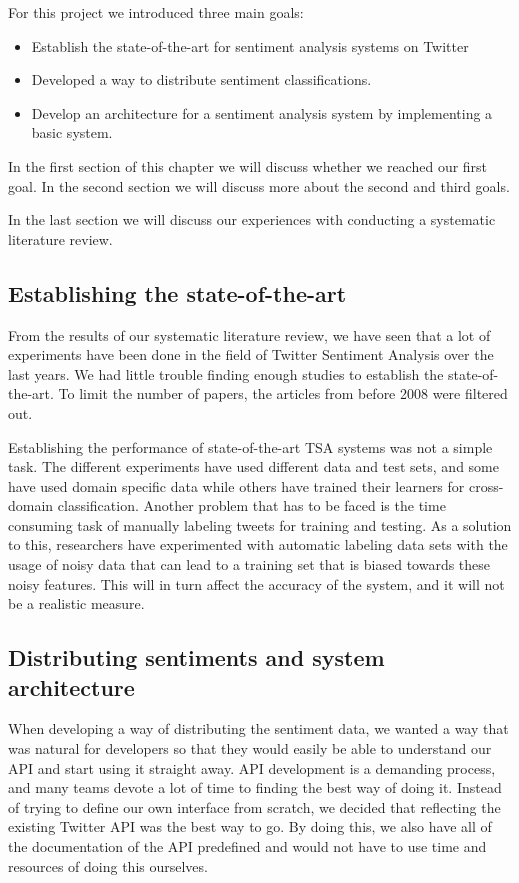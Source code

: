 
For this project we introduced three main goals:
\begin{itemize}
\item Establish the state-of-the-art for sentiment analysis systems on Twitter
\item Developed a way to distribute sentiment classifications.
\item Develop an architecture for a sentiment analysis system by implementing a basic system.
\end{itemize}

In the first section of this chapter we will discuss whether we reached our first goal. In the second section we will discuss more about the second and third goals. 

In the last section we will discuss our experiences with conducting a systematic literature review. 


\subsection{Establishing the state-of-the-art}
From the results of our systematic literature review, we have seen that a lot of experiments have been done in the field of Twitter Sentiment Analysis over the last years. We had little trouble finding enough studies to establish the state-of-the-art. To limit the number of papers, the articles from before 2008 were filtered out.

Establishing the performance of state-of-the-art TSA systems was not a simple task. The different experiments have used different data and test sets, and some have used domain specific data while others have trained their learners for cross-domain classification. Another problem that has to be faced is the time consuming task of manually labeling tweets for training and testing. As a solution to this, researchers have experimented with automatic labeling data sets with the usage of noisy data that can lead to a training set that is biased towards these noisy features. This will in turn affect the accuracy of the system, and it will not be a realistic measure. 

\subsection{Distributing sentiments and system architecture}

When developing a way of distributing the sentiment data, we wanted a way that was natural for developers so that they would easily be able to understand our API and start using it straight away. API development is a demanding process, and many teams devote a lot of time to finding the best way of doing it. Instead of trying to define our own interface from scratch, we decided that reflecting the existing Twitter API was the best way to go. By doing this, we also have all of the documentation of the API predefined and would not have to use time and resources of doing this ourselves. 

